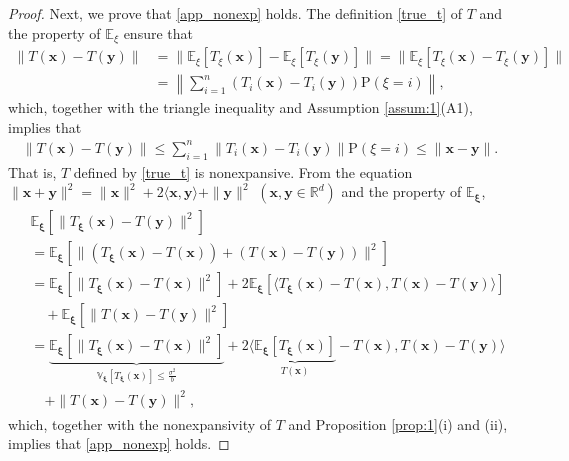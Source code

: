\documentclass[10pt,a4paper]{amsart}
\begin{document}
\begin{proof}
Next, we prove that \eqref{app_nonexp} holds. The definition \eqref{true_t} of $T$ and the property of $\mathbb{E}_\xi$ ensure that
\begin{align*}
\| T(\bm{x}) - T (\bm{y})  \|
&= 
\| \mathbb{E}_\xi [T_\xi (\bm{x}) ] - \mathbb{E}_\xi [T_\xi (\bm{y}) ] \|
= 
\| \mathbb{E}_\xi [T_\xi (\bm{x}) - T_\xi (\bm{y}) ] \|\\
&= 
\left\| \sum_{i=1}^n (T_i (\bm{x}) - T_i (\bm{y}) ) \mathrm{P}(\xi = i) \right\|,
\end{align*}
which, together with the triangle inequality and Assumption \ref{assum:1}(A1), implies that 
\begin{align}\label{nonexp_T}
\| T(\bm{x}) - T (\bm{y})  \|
\leq
\sum_{i=1}^n \| T_i (\bm{x}) - T_i (\bm{y}) \| \mathrm{P}(\xi = i)
\leq 
\| \bm{x} - \bm{y} \|.
\end{align}
That is, $T$ defined by \eqref{true_t} is nonexpansive. From the equation $\|\bm{x} + \bm{y}\|^2 = \|\bm{x}\|^2 + 2 \langle \bm{x},\bm{y} \rangle + \|\bm{y}\|^2$ $(\bm{x},\bm{y} \in \mathbb{R}^d)$ and the property of $\mathbb{E}_{\bm{\xi}}$,
\begin{align}\label{ineq:1}
\begin{split}
&\mathbb{E}_{\bm{\xi}} \left[ \| T_{\bm{\xi}}(\bm{x}) - T(\bm{y}) \|^2 \right]\\
&= 
\mathbb{E}_{\bm{\xi}} \left[ \| (T_{\bm{\xi}}(\bm{x}) - T(\bm{x})) 
+ (T(\bm{x}) - T (\bm{y})) \|^2 \right]\\
&=
\mathbb{E}_{\bm{\xi}} \left[ \| T_{\bm{\xi}}(\bm{x}) - T(\bm{x}) \|^2 \right]
+ 2 \mathbb{E}_{\bm{\xi}} \left[ \langle T_{\bm{\xi}}(\bm{x}) - T(\bm{x}),  T(\bm{x}) - T (\bm{y}) \rangle \right]\\
&\quad + 
\mathbb{E}_{\bm{\xi}} \left[ \| T(\bm{x}) - T (\bm{y})  \|^2 \right]\\
&= 
\underbrace{\mathbb{E}_{\bm{\xi}} \left[ \| T_{\bm{\xi}}(\bm{x}) - T(\bm{x}) \|^2 \right]}_{\mathbb{V}_{\bm{\xi}}[T_{\bm{\xi}}(\bm{x})] \leq \frac{\sigma^2}{b}}
+ 2  \langle \underbrace{\mathbb{E}_{\bm{\xi}} \left[ T_{\bm{\xi}}(\bm{x})\right]}_{T(\bm{x})} - T(\bm{x}),  T(\bm{x}) - T (\bm{y}) \rangle \\
&\quad + 
\| T(\bm{x}) - T (\bm{y})  \|^2,
\end{split} 
\end{align}
which, together with the nonexpansivity of $T$ and Proposition \ref{prop:1}(i) and (ii), implies that \eqref{app_nonexp} holds.


\end{proof}
\end{document}
